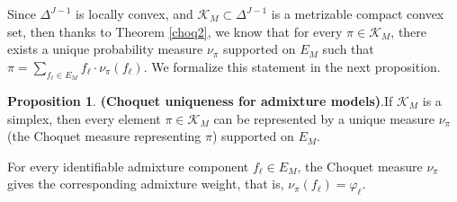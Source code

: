\documentclass[12pt, reqno]{amsart}
\theoremstyle{definition}
\newtheorem{proposition}[theorem]{Proposition}
\begin{document}

Since $\Delta^{J-1}$ is locally convex, and $\mathcal{K}_M \subset \Delta^{J-1}$ is a metrizable compact convex set, then thanks to Theorem \ref{choq2}, we know that for every $\pi \in \mathcal{K}_M$, there exists a unique probability measure $\nu_{\pi}$ supported on $E_M$ such that $\pi=\sum_{f_\ell \in E_M} f_\ell \cdot \nu_{\pi}(f_\ell)$. We formalize this statement in the next proposition.





\begin{proposition}{\textbf{(Choquet uniqueness for admixture models)}.}\label{simplex_conseq}
If $\mathcal{K}_M$ is a simplex, then every element $\pi \in \mathcal{K}_M$ can be represented by a unique measure $\nu_{\pi}$ (the Choquet measure representing $\pi$) supported on $E_M$.
\end{proposition}
For every identifiable admixture component $f_\ell\in E_M$, the Choquet measure $\nu_{\pi}$ gives the corresponding admixture weight, that is, $\nu_{\pi}(f_\ell)=\varphi_{\ell}$.
\end{document}
